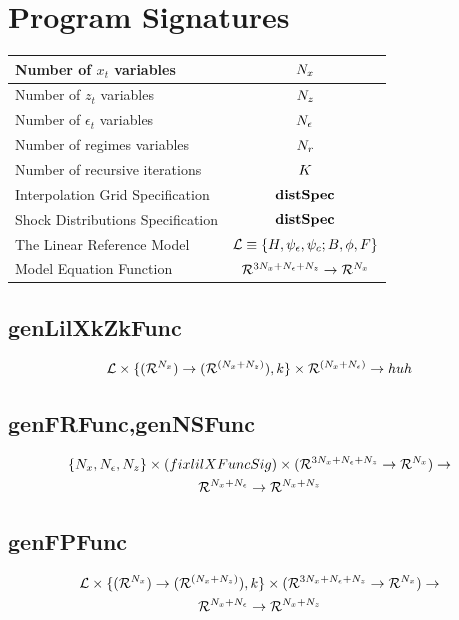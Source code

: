\documentclass[12pt]{article}
\begin{document}

\section{Program Signatures}
\label{sec:program-listings}
\begin{tabular}{|l|c|}
\hline
Number of $x_t$ variables&${N_x}$\\
\hline
Number of $z_t$ variables&${N_z}$\\
\hline
Number of $\epsilon_t$ variables&${N_\epsilon}$\\
\hline
Number of regimes variables&${N_r}$\\
\hline
Number of recursive iterations&${K}$\\
\hline
Interpolation Grid Specification&${\mathbf{distSpec}}$\\
\hline
Shock Distributions  Specification&${\mathbf{distSpec}}$\\
\hline
The Linear Reference Model&${\mathcal{L}}\equiv{\{H,\psi_\epsilon,\psi_c;B,\phi,F\}}$\\  
\hline
Model Equation Function&${{\mathcal{R}^{3{N_x}+{N_\epsilon}+{N_z}}}\rightarrow{\mathcal{R}^{{N_x}}}}$\\
\hline
\end{tabular}
\subsection{genLilXkZkFunc}
\label{sec:genlilxkzkfunc}
\begin{gather*}
\linMod \times \{  \bigXFuncSig, k \} \times \Rn{(\numX+\numEps)} \rightarrow
huh%
\end{gather*}

\subsection{genFRFunc,genNSFunc}
\label{sec:genfrfunc}


\begin{gather*}
\{{N_x},{N_\epsilon},{N_z}\}\times({fix lilXFuncSig})\times ({{\mathcal{R}^{3{N_x}+{N_\epsilon}+{N_z}}}\rightarrow{\mathcal{R}^{{N_x}}}})    \rightarrow\\
{{\mathcal{R}^{{N_x}+{N_\epsilon}}}\rightarrow{\mathcal{R}^{{N_x}+{N_z}}}}
\end{gather*}



\subsection{genFPFunc}
\label{sec:genfpfunc}
\begin{gather*}
{\mathcal{L}} \times \{  {({\mathcal{R}^{{N_x}}})\rightarrow ({\mathcal{R}^{({{N_x}+{N_z}})}})}, k \} \times ({{\mathcal{R}^{3{N_x}+{N_\epsilon}+{N_z}}}\rightarrow{\mathcal{R}^{{N_x}}}})    \rightarrow\\ 
{{\mathcal{R}^{{N_x}+{N_\epsilon}}}\rightarrow{\mathcal{R}^{{N_x}+{N_z}}}}
\end{gather*}
\end{document}
